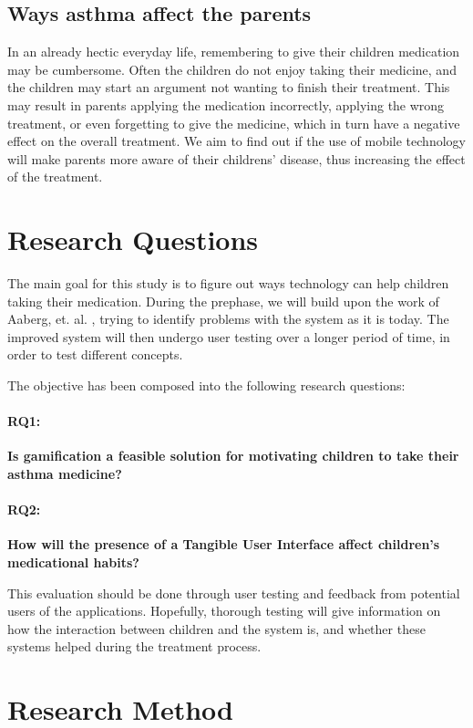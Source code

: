 \subsection{Ways asthma affect the parents}
In an already hectic everyday life, remembering to give their children medication may be cumbersome. Often the children do not enjoy taking their medicine, and the children may start an argument not wanting to finish their treatment. This may result in parents applying the medication incorrectly, applying the wrong treatment, or even forgetting to give the medicine, which in turn have a negative effect on the overall treatment. We aim to find out if the use of mobile technology will make parents more aware of their childrens' disease, thus increasing the effect of the treatment.  


\section{Research Questions}
\label{sec:researchquestions}
The main goal for this study is to figure out ways technology can help children taking their medication. During the prephase, we will build upon the work of Aaberg, et. al.  \cite{CustomerDriven}, trying to identify problems with the system as it is today. The improved system will then undergo user testing over a longer period of time, in order to test different concepts.


The objective has been composed into the following research questions: 

\paragraph{RQ1:}
\textbf{Is gamification a feasible solution for motivating children to take their asthma medicine?}


\paragraph{RQ2:}
\textbf{How will the presence of a Tangible User Interface affect children's medicational habits?}


This evaluation should be done through user testing and feedback from potential users of the applications. Hopefully, thorough testing will give information on how the interaction between children and the system is, and whether these systems helped during the treatment process.

\section{Research Method}
\label{sec:researchmethod}

